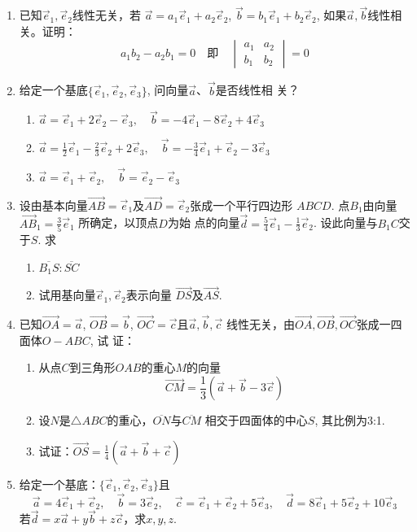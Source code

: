 \begin{ex}
\begin{enumerate}
    \item  已知$\vec{e}_1,\vec{e}_2$线性无关，若
    $\vec{a}=a_1\vec{e}_1+a_2\vec{e}_2$, $\vec{b}=b_1\vec{e}_1+b_2\vec{e}_2$,
    如果$\vec{a},\vec{b}$线性相关。证明：
   \[ a_1b_2-a_2b_1=0\quad \text{即}\quad \begin{vmatrix}
       a_1&a_2\\b_1&b_2
   \end{vmatrix}=0\]
\item 给定一个基底$\{\vec{e}_1,\vec{e}_2,\vec{e}_3\}$,
    问向量$\vec{a}$、$\vec{b}$是否线性相
    关？
\begin{enumerate}
    \item $\vec{a}=\vec{e}_1+2\vec{e}_2-\vec{e}_3,\quad \vec{b}=-4\vec{e}_1-8\vec{e}_2+4\vec{e}_3$
    \item $\vec{a}=\frac{1}{2}\vec{e}_1-\frac{2}{3}\vec{e}_2+2\vec{e}_3,\quad \vec{b}=-\frac{3}{4}\vec{e}_1+\vec{e}_2-3\vec{e}_3$
    \item $\vec{a}=\vec{e}_1+\vec{e}_2,\quad \vec{b}=\vec{e}_2-\vec{e}_3$
\end{enumerate}
\item 设由基本向量$\Vec{AB}=\vec{e}_1$及$\Vec{AD}=\vec{e}_2$张成一个平行四边形
    $ABCD$. 点$B_1$由向量
    $\Vec{AB}_1=\frac{3}{5}\vec{e}_1$
    所确定，以顶点$D$为始
    点的向量$\vec{d}=\frac{5}{4}\vec{e}_1-\frac{1}{3}\vec{e}_2$. 
    设此向量与$B_1C$交于$S$. 求
\begin{enumerate}
    \item $\overline{B_1S}:\overline{SC}$
    \item 试用基向量$\vec{e}_1,\vec{e}_2$表示向量
    $\Vec{DS}$及$\Vec{AS}$.
\end{enumerate}
\item 已知$\Vec{OA}=\vec{a}$, $\Vec{OB}=\vec{b}$, $\Vec{OC}=\vec{c}$且$\vec{a},\vec{b},\vec{c}$
    线性无关，由$\Vec{OA},\Vec{OB},\Vec{OC}$张成一四面体$O-ABC$, 试
    证：
\begin{enumerate}
    \item 从点$C$到三角形$OAB$的重心$M$的向量
    \[\Vec{CM}=\frac{1}{3}\left(\vec{a}+\vec{b}-3\vec{c}\right)\]
    \item 设$N$是$\triangle ABC$的重心，$\overline{ON}$与$\overline{CM}$ 相交于四面体的中心$S$, 其比例为3:1.
    \item 试证：$\Vec{OS}=\frac{1}{4}\left(\vec{a}+\vec{b}+\vec{c}\right)$
\end{enumerate}
    
\item 给定一个基底：$\{\vec{e}_1,\vec{e}_2,\vec{e}_3\}$且
\[\vec{a}=4\vec{e}_1+\vec{e}_2,\quad \vec{b}=3\vec{e}_2,\quad \vec{c}=\vec{e}_1+\vec{e}_2+5\vec{e}_3,\quad \vec{d}=8\vec{e}_1+5\vec{e}_2+10\vec{e}_3\]
若$\vec{d}=x\vec{a}+y\vec{b}+z\vec{c}$，求$x,y,z$.
\end{enumerate}
\end{ex}

